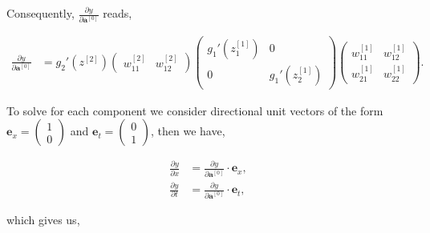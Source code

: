 \documentclass{article}
\begin{document}
Consequently, $\frac{\partial y}{\partial \textbf{a}^{[0]}}$ reads,

\begin{align}
\frac{\partial y}{\partial \textbf{a}^{[0]}} &= g_2'(z^{[2]})
\begin{pmatrix}
w_{11}^{[2]} & w_{12}^{[2]} 
\end{pmatrix}
\begin{pmatrix}
g_1'(z_1^{[1]}) & 0 \\
0 & g_1'(z_2^{[1]})
\end{pmatrix}
\begin{pmatrix}
w_{11}^{[1]} & w_{12}^{[1]} \\
w_{21}^{[1]} & w_{22}^{[1]}
\end{pmatrix}. 
\end{align}

To solve for each component we consider directional unit vectors of the form $\textbf{e}_x = \begin{pmatrix}
1 \\
0
\end{pmatrix}$ and $\textbf{e}_t =  \begin{pmatrix}
0 \\
1
\end{pmatrix}$, then we have, 

\begin{align}
\frac{\partial y}{\partial x}  &= \frac{\partial y}{\partial \textbf{a}^{[0]}} \cdot \textbf{e}_x,   \\
\frac{\partial y}{\partial t} &= \frac{\partial y}{\partial \textbf{a}^{[0]}} \cdot \textbf{e}_t,
\end{align}

which gives us,
\end{document}
